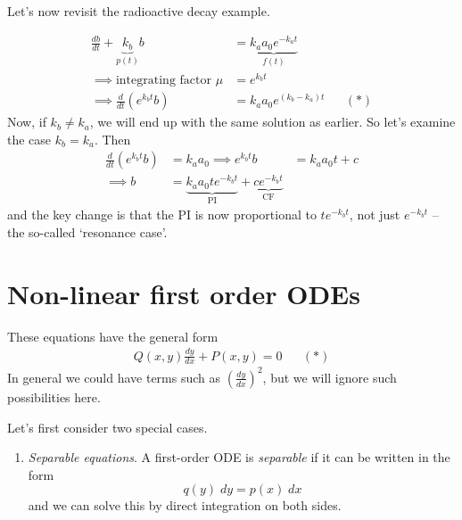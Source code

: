 \documentclass{../template/note}
\begin{document}
    Let's now revisit the radioactive decay example.

    \begin{example}
        \begin{align*}
            \frac{db}{dt} + \underbrace{k_b}_{p(t)}b &= \underbrace{k_aa_0e^{-k_at}}_{f(t)} \\
            \implies \text{integrating factor } \mu &= e^{k_bt} \\
            \implies \frac{d}{dt}\left(e^{k_bt}b\right) &= k_aa_0e^{(k_b-k_a)t} && (*)
        \end{align*}
        Now, if \(k_b \neq k_a\), we will end up with the same solution as earlier. So let's examine the case \(k_b = k_a\). Then
        \begin{align*}
            \frac{d}{dt}\left(e^{k_bt}b\right) &= k_aa_0
            \implies e^{k_bt}b &= k_aa_0t + c \\
            \implies b &= \underbrace{k_aa_0te^{-k_bt}}_{\text{PI}} + \underbrace{ce^{-k_bt}}_{\text{CF}}
        \end{align*}
        and the key change is that the PI is now proportional to \(te^{-k_bt}\), not just \(e^{-k_bt}\) -- the so-called `resonance case'.        
    \end{example}
    

    \section{Non-linear first order ODEs}
    
    These equations have the general form
    \begin{align*}
        Q(x, y) \frac{dy}{dx} + P(x, y) = 0 && (*)
    \end{align*}
    In general we could have terms such as \(\left(\frac{dy}{dx}\right)^2\), but we will ignore such possibilities here.

    Let's first consider two special cases.

    \begin{enumerate}
        \item \emph{Separable equations}. A first-order ODE is \emph{separable} if it can be written in the form
        \[
            q(y) \; dy = p(x) \; dx
        \]
        and we can solve this by direct integration on both sides.
    \end{enumerate}
\end{document}
